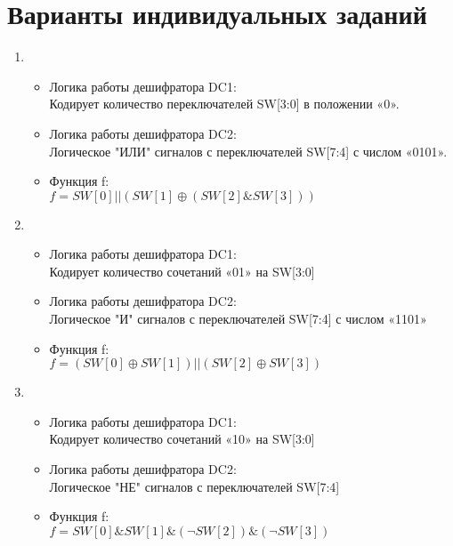 \section{Варианты индивидуальных заданий}


\begin{enumerate}
  
  \setlength\itemsep{1em}

  \item{
    \begin{itemize}
    \item Логика работы дешифратора DC1: \\
      Кодирует количество переключателей SW[3:0] в положении «0».
    \item Логика работы дешифратора DC2: \\ 
      Логическое "ИЛИ" сигналов с переключателей SW[7:4] с числом «0101».
    \item Функция f:\\
      $f = SW[0] || (SW[1] \oplus (SW[2] \& SW[3]))$
    \end{itemize}
  }

  \item{
    \begin{itemize}
    \item Логика работы дешифратора DC1: \\
      Кодирует количество сочетаний «01» на SW[3:0]
    \item Логика работы дешифратора DC2: \\ 
      Логическое "И" сигналов с переключателей SW[7:4] с числом «1101»
    \item Функция f:\\
      $f = (SW[0] \oplus  SW[1]) || (SW[2] \oplus  SW[3])$
    \end{itemize}
  }

    \item{
    \begin{itemize}
    \item Логика работы дешифратора DC1: \\
      Кодирует количество сочетаний «10» на SW[3:0]
    \item Логика работы дешифратора DC2: \\ 
      Логическое "НЕ" сигналов с переключателей SW[7:4]
    \item Функция f:\\
      $f = SW[0] \& SW[1] \& (\neg SW[2]) \& (\neg SW[3])$
    \end{itemize}
  }


\end{enumerate}
